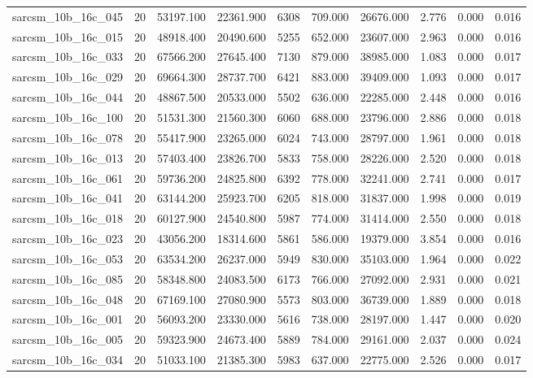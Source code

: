 \begin{tabular}{lrrrrrrrrr}
sarcsm\_10b\_16c\_045 & 20 & 53197.100 & 22361.900 & 6308 & 709.000 & 26676.000 & 2.776 & 0.000 & 0.016 \\
sarcsm\_10b\_16c\_015 & 20 & 48918.400 & 20490.600 & 5255 & 652.000 & 23607.000 & 2.963 & 0.000 & 0.016 \\
sarcsm\_10b\_16c\_033 & 20 & 67566.200 & 27645.400 & 7130 & 879.000 & 38985.000 & 1.083 & 0.000 & 0.017 \\
sarcsm\_10b\_16c\_029 & 20 & 69664.300 & 28737.700 & 6421 & 883.000 & 39409.000 & 1.093 & 0.000 & 0.017 \\
sarcsm\_10b\_16c\_044 & 20 & 48867.500 & 20533.000 & 5502 & 636.000 & 22285.000 & 2.448 & 0.000 & 0.016 \\
sarcsm\_10b\_16c\_100 & 20 & 51531.300 & 21560.300 & 6060 & 688.000 & 23796.000 & 2.886 & 0.000 & 0.018 \\
sarcsm\_10b\_16c\_078 & 20 & 55417.900 & 23265.000 & 6024 & 743.000 & 28797.000 & 1.961 & 0.000 & 0.018 \\
sarcsm\_10b\_16c\_013 & 20 & 57403.400 & 23826.700 & 5833 & 758.000 & 28226.000 & 2.520 & 0.000 & 0.018 \\
sarcsm\_10b\_16c\_061 & 20 & 59736.200 & 24825.800 & 6392 & 778.000 & 32241.000 & 2.741 & 0.000 & 0.017 \\
sarcsm\_10b\_16c\_041 & 20 & 63144.200 & 25923.700 & 6205 & 818.000 & 31837.000 & 1.998 & 0.000 & 0.019 \\
sarcsm\_10b\_16c\_018 & 20 & 60127.900 & 24540.800 & 5987 & 774.000 & 31414.000 & 2.550 & 0.000 & 0.018 \\
sarcsm\_10b\_16c\_023 & 20 & 43056.200 & 18314.600 & 5861 & 586.000 & 19379.000 & 3.854 & 0.000 & 0.016 \\
sarcsm\_10b\_16c\_053 & 20 & 63534.200 & 26237.000 & 5949 & 830.000 & 35103.000 & 1.964 & 0.000 & 0.022 \\
sarcsm\_10b\_16c\_085 & 20 & 58348.800 & 24083.500 & 6173 & 766.000 & 27092.000 & 2.931 & 0.000 & 0.021 \\
sarcsm\_10b\_16c\_048 & 20 & 67169.100 & 27080.900 & 5573 & 803.000 & 36739.000 & 1.889 & 0.000 & 0.018 \\
sarcsm\_10b\_16c\_001 & 20 & 56093.200 & 23330.000 & 5616 & 738.000 & 28197.000 & 1.447 & 0.000 & 0.020 \\
sarcsm\_10b\_16c\_005 & 20 & 59323.900 & 24673.400 & 5889 & 784.000 & 29161.000 & 2.037 & 0.000 & 0.024 \\
sarcsm\_10b\_16c\_034 & 20 & 51033.100 & 21385.300 & 5983 & 637.000 & 22775.000 & 2.526 & 0.000 & 0.017 \\

\end{tabular}
